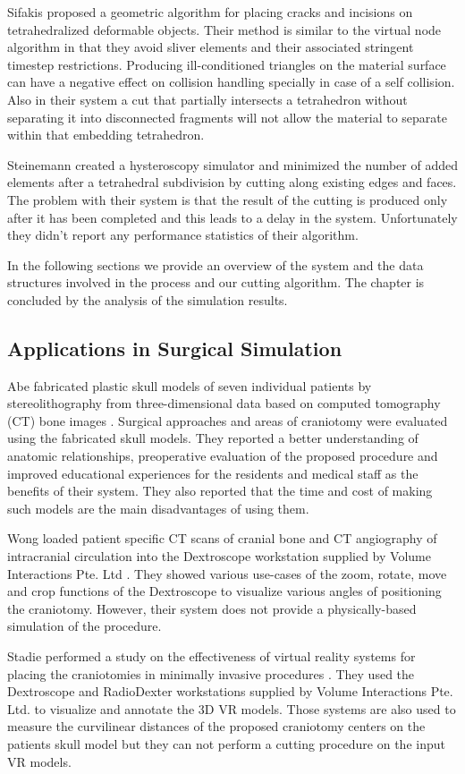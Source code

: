 Sifakis \etal \cite{Sifakis2007} proposed a geometric algorithm for placing cracks and incisions on 
tetrahedralized deformable objects. Their method is similar to the virtual node algorithm in that they avoid 
sliver elements and their associated stringent timestep restrictions. Producing ill-conditioned triangles on 
the material surface can have a negative effect on collision handling specially in case of a self collision.
Also in their system a cut that partially intersects a tetrahedron without separating it into disconnected 
fragments will not allow the material to separate within that embedding tetrahedron.

Steinemann \etal \cite{Steinemann} created a hysteroscopy simulator and minimized the number of added elements 
after a tetrahedral subdivision by cutting along existing edges and faces. The problem with their system is that
the result of the cutting is produced only after it has been completed and this leads to a delay in the system. 
Unfortunately they didn't report any performance statistics of their algorithm. 

In the following sections we provide an overview of the system and the data structures involved in the process 
and our cutting algorithm. The chapter is concluded by the analysis of the simulation results.

\subsection{Applications in Surgical Simulation}
Abe \etal fabricated plastic skull models of seven individual patients by stereolithography from three-dimensional
data based on computed tomography (CT) bone images \cite{Abe1998}. Surgical approaches and areas of craniotomy were 
evaluated using the fabricated skull models. They reported a better understanding of anatomic relationships, preoperative
evaluation of the proposed procedure and improved educational experiences for the residents and medical staff as the benefits of 
their system. They also reported that the time and cost of making such models are the main disadvantages of using them.

Wong \etal loaded patient specific CT scans of cranial bone and CT angiography of intracranial circulation
into the Dextroscope workstation supplied by Volume Interactions Pte. Ltd \cite{Wong2007}. They showed various 
use-cases of the zoom, rotate, move and crop functions of the Dextroscope to visualize various angles of 
positioning the craniotomy. However, their system does not provide a physically-based simulation of the procedure. 

Stadie \etal performed a study on the effectiveness of virtual reality systems for placing the craniotomies 
in minimally invasive procedures \cite{Stadie2011}.  They used the Dextroscope and RadioDexter workstations 
supplied by Volume Interactions Pte. Ltd. to visualize and annotate the 3D VR models. 
Those systems are also used to measure the curvilinear distances of the proposed craniotomy centers on the 
patients skull model but they can not perform a cutting procedure on the input VR models.



\setlength{\unitlength}{\savedunitlength}
